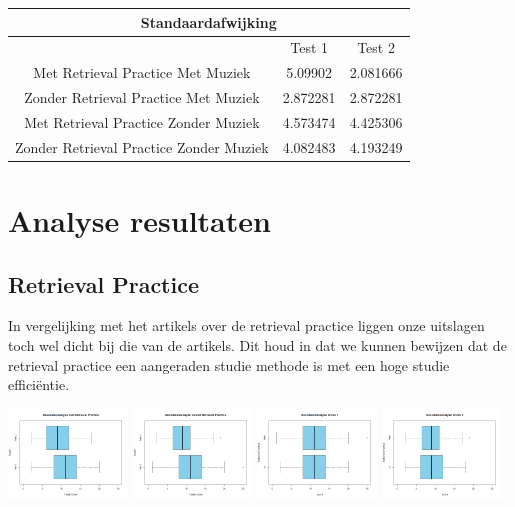 \documentclass{hogent-article}
\begin{document}
	\begin{tabular}{ |c|c|c| }
	\hline
		\multicolumn{3}{|c|}{Standaardafwijking} \\
	\hline
		& Test 1 & Test 2 \\
	\hline
		Met Retrieval Practice Met Muziek  & 5.09902 & 2.081666 \\
		Zonder Retrieval Practice Met Muziek & 2.872281 & 2.872281 \\
		Met Retrieval Practice Zonder Muziek & 4.573474  & 4.425306 \\
		Zonder Retrieval Practice Zonder Muziek & 4.082483 & 4.193249 \\
	\hline
	\end{tabular}
			
	\section{Analyse resultaten} %
	\subsection{Retrieval Practice}
	In vergelijking met het artikels over de retrieval practice \autocite{butler2010repeated, pyc2012test, karpicke2007repeated, karpicke2008critical} liggen onze uitslagen toch wel dicht bij die van de artikels. Dit houd in dat we kunnen bewijzen dat de retrieval practice een aangeraden studie methode is met een hoge studie efficiëntie.
	
	\includegraphics[width=120px]{Rplot_MetRetrievalPractice}
	\includegraphics[width=120px]{Rplot_ZonderRetrievalPractice}
	\includegraphics[width=120px]{Rplot_RetrievalPractice_Score1}
	\includegraphics[width=120px]{Rplot_RetrievalPractice_Score2}
	
\end{document}
